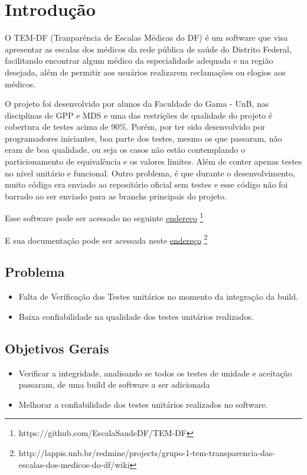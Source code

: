 \chapter[Introdução]{Introdução}

O TEM-DF (Tranparência de Escalas Médicas do DF) é um software que visa apresentar as escalas dos médicos da rede pública de saúde do Distrito Federal, facilitando encontrar algum médico da especialidade adequada e na região desejada, além de permitir aos usuários realizarem reclamações ou elogios aos médicos.


O projeto foi desenvolvido por alunos da Faculdade do Gama - UnB, nas disciplinas de GPP e MDS e uma das restrições de qualidade do projeto é cobertura de testes acima de 90\%. Porém, por ter sido desenvolvido por programadores iniciantes, boa parte dos testes, mesmo os que passaram, não eram de boa qualidade, ou seja os casos não estão contemplando o particionamento de equivalência e os valores limites. Além de conter apenas testes no nível unitário e funcional. Outro problema, é que durante o desenvolvimento, muito código era enviado ao repositório oficial sem testes e esse código não foi barrado ao ser enviado para as branchs principais do projeto.


Esse software pode ser acessado no seguinte \href{https://github.com/EscalaSaudeDF/TEM-DF}{endereço}%
\footnote{https://github.com/EscalaSaudeDF/TEM-DF}

E sua documentação pode ser acessada neste \href{http://lappis.unb.br/redmine/projects/grupo-1-tem-transparencia-das-escalas-dos-medicos-do-df/wiki}{endereço}%
\footnote{http://lappis.unb.br/redmine/projects/grupo-1-tem-transparencia-das-escalas-dos-medicos-do-df/wiki}


\section{Problema}
\begin{itemize}
\item Falta de Verificação dos Testes unitários no momento da integração da build.
\item Baixa confiabilidade na qualidade dos testes unitários realizados.
\end{itemize}

\section{Objetivos Gerais }
\begin{itemize}
    \item Verificar a integridade, analisando se todos os testes de unidade e aceitação passaram, de uma build de software a ser adicionada
    \item Melhorar a confiabilidade dos testes unitários realizados no software.
\end{itemize}

